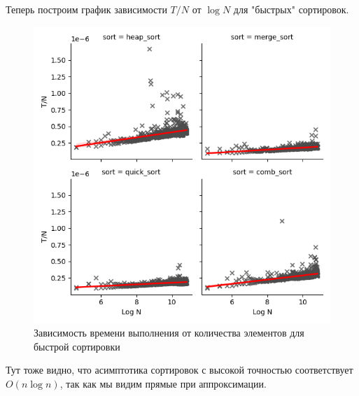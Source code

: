 \documentclass[12pt,a4paper]{article}
\begin{document}
\clearpage
Теперь построим график зависимости $T/N$ от $\log N$ для "быстрых" сортировок.
\begin{figure}[!ht]
\includegraphics[width=\textwidth]{imgs/compare_log.png}
\caption{Зависимость времени выполнения от количества элементов для быстрой сортировки}
\end{figure}

Тут тоже видно, что асимптотика сортировок с высокой точностью соответствует $O(n \log n)$, так как мы видим прямые при аппроксимации.
\end{document}
